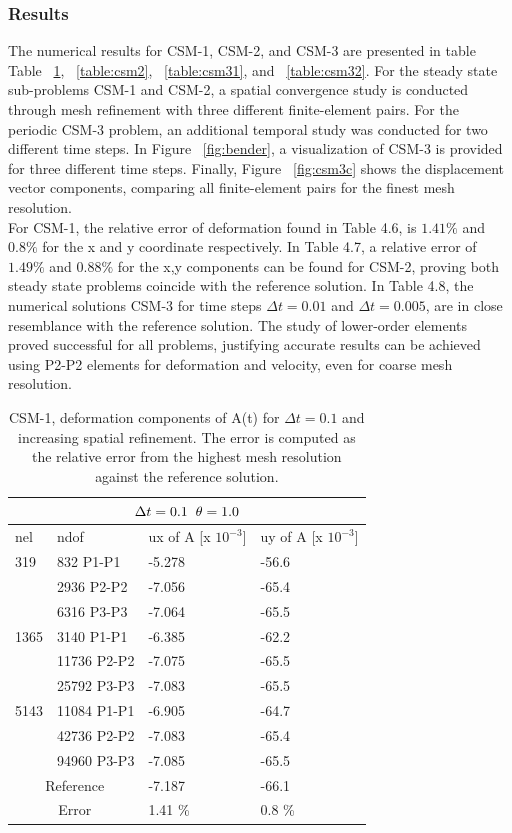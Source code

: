\subsubsection*{Results}
The numerical results for CSM-1, CSM-2, and CSM-3 are presented in table Table ~\ref{table:csm1}, ~\ref{table:csm2}, ~\ref{table:csm31}, and ~\ref{table:csm32}. For the steady state sub-problems CSM-1 and CSM-2, a spatial convergence study is conducted through mesh refinement with three different finite-element pairs. For the periodic CSM-3 problem, an additional temporal study was conducted for two different time steps. In Figure ~\ref{fig:bender}, a visualization of CSM-3 is provided for three different time steps. Finally, Figure ~\ref{fig:csm3c} shows the displacement vector components, comparing all finite-element pairs for the finest mesh resolution. \\
 For CSM-1, the relative error of deformation found in Table 4.6, is $1.41 \%$ and $0.8\%$ for the x and y coordinate respectively. In Table 4.7, a relative error of   $1.49 \%$ and $0.88\%$ for the x,y components can be found for CSM-2, proving both steady state problems coincide with the reference solution. In Table 4.8, the numerical solutions CSM-3 for time steps $\Delta t = 0.01$ and $\Delta t = 0.005$, are in close resemblance with the reference solution. The study of lower-order elements proved successful for all problems, justifying accurate results can be achieved using P2-P2 elements for deformation and velocity, even for coarse mesh resolution. 
\begin{table}[h!]
\centering
\begin{tabular}{ |p{1cm}||p{2.7cm}|p{3.3cm}|p{3.3cm}|}
\hline
  \multicolumn{4}{|c|}{$\Delta t = 0.1 \hspace{2mm} \theta = 1.0$} \\
\hline
nel & ndof & ux of A [x $10^{-3}$]  &uy of A [x $10^{-3}$] \\
\hline
 319     & 832 P1-P1  & -5.278 &  -56.6 \\
     & 2936 P2-P2 & -7.056 &  -65.4 \\
      & 6316 P3-P3 &  -7.064 &   -65.5  \\
 \hline
  1365    & 3140 P1-P1  & -6.385 &  -62.2 \\
     & 11736 P2-P2 & -7.075 &  -65.5 \\
     & 25792 P3-P3 & -7.083 &  -65.5 \\
 \hline
  5143    & 11084 P1-P1 & -6.905 &  -64.7  \\
     & 42736 P2-P2 & -7.083 &  -65.4\\
     & 94960 P3-P3 & -7.085 &  -65.5  \\
  \hline
  \multicolumn{2}{|c|}{Reference}  &-7.187    & -66.1 \\
   \hline
    \multicolumn{2}{|c|}{Error}  & 1.41 \%   & 0.8 \%\\
   \hline
\end{tabular}
\caption{CSM-1, deformation components of A(t) for $\Delta t = 0.1$ and increasing spatial refinement. The error is computed as the relative error from the highest mesh resolution against the reference solution.}
\label{table:csm1}
\end{table}
